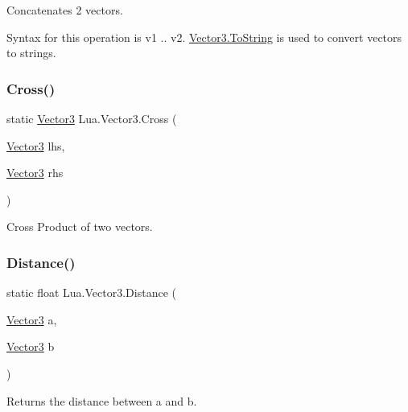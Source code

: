 Concatenates 2 vectors. 

Syntax for this operation is {\ttfamily v1 .. v2}. \mbox{\hyperlink{class_lua_1_1_vector3_a63129be99b82f76bb94c8267b0dcd692}{Vector3.\+To\+String}} is used to convert vectors to strings. \mbox{\label{class_lua_1_1_vector3_aada99c9426a2253aed6e6a150efade76}} 
\subsubsection{\texorpdfstring{Cross()}{Cross()}}
{\footnotesize\ttfamily static \mbox{\hyperlink{class_lua_1_1_vector3}{Vector3}} Lua.\+Vector3.\+Cross (\begin{DoxyParamCaption}\item[{\mbox{\hyperlink{class_lua_1_1_vector3}{Vector3}}}]{lhs,  }\item[{\mbox{\hyperlink{class_lua_1_1_vector3}{Vector3}}}]{rhs }\end{DoxyParamCaption})\hspace{0.3cm}{\ttfamily [static]}}



Cross Product of two vectors. 

\mbox{\label{class_lua_1_1_vector3_a8c4bd7e288f7857355aff2f159e86b83}} 
\subsubsection{\texorpdfstring{Distance()}{Distance()}}
{\footnotesize\ttfamily static float Lua.\+Vector3.\+Distance (\begin{DoxyParamCaption}\item[{\mbox{\hyperlink{class_lua_1_1_vector3}{Vector3}}}]{a,  }\item[{\mbox{\hyperlink{class_lua_1_1_vector3}{Vector3}}}]{b }\end{DoxyParamCaption})\hspace{0.3cm}{\ttfamily [static]}}



Returns the distance between a and b. 

\mbox{\label{class_lua_1_1_vector3_aee6533ff540a011a854efbbe29664fe4}} 
